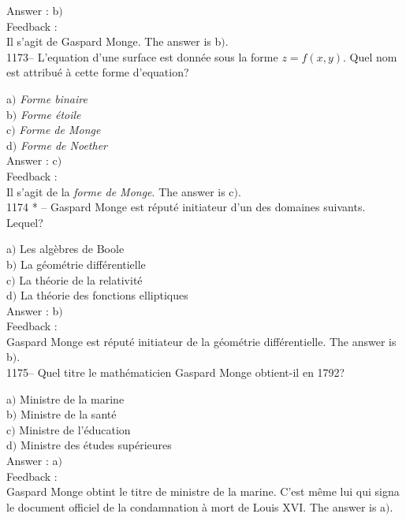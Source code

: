 ﻿\documentclass[letterpaper, 12pt]{article}
\begin{document}
Answer : b$)$\\

Feedback : \\
Il s'agit de Gaspard Monge.
The answer is b$)$.\\

1173-- L'equation d'une surface est donn\'ee sous la forme
$z=f(x,y)$. Quel nom est attribu\'e \`a cette forme d'equation?

a$)$ {\sl Forme binaire} \\
b$)$ {\sl Forme \'etoile} \\
c$)$ {\sl Forme de Monge} \\
d$)$ {\sl Forme de Noether}\\

Answer : c$)$\\

Feedback : \\
Il s'agit de la {\sl forme de Monge}.
The answer is c$)$.\\

1174 * -- Gaspard Monge est r\'eput\'e initiateur d'un des domaines
suivants. Lequel?

a$)$ Les alg\`ebres de Boole \\
b$)$ La g\'eom\'etrie diff\'erentielle \\
c$)$ La th\'eorie de la relativit\'e \\
d$)$ La th\'eorie des fonctions elliptiques\\

Answer : b$)$\\

Feedback : \\
Gaspard Monge est r\'eput\'e initiateur de la g\'eom\'etrie
diff\'erentielle.
The answer is b$)$.\\

1175-- Quel titre le math\'ematicien Gaspard Monge obtient-il en
1792?

a$)$ Ministre de la marine \\
b$)$ Ministre de la sant\'e \\
c$)$ Ministre de l'\'education  \\
d$)$ Ministre des \'etudes sup\'erieures\\

Answer : a$)$\\

Feedback : \\
Gaspard Monge obtint le titre de ministre de la marine. C'est m\^eme
lui qui signa le document officiel de la condamnation \`a mort de
Louis XVI.
The answer is a$)$.\\
\end{document}
